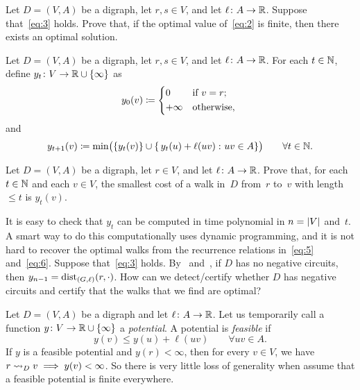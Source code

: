 \documentclass[10pt,reqno]{amsart}
\begin{document}
\begin{exercise}
  \label{ex:4}
  Let \(D = (V,A)\) be a digraph, let \(r,s \in V\), and let
  \(\ell \colon A \to \mathbb{R}\).  Suppose that~\eqref{eq:3} holds.
  Prove that, if the optimal value of~\eqref{eq:2} is finite, then
  there exists an optimal solution.
\end{exercise}

Let \(D = (V,A)\) be a digraph, let \(r,s \in V\), and let
\(\ell \colon A \to \mathbb{R}\).  For each \(t \in \mathbb{N}\), define
\(y_t \colon V \to \mathbb{R} \cup \{\infty\}\) as
\begin{equation}
  \label{eq:5}
  y_0(v)
  \coloneqq
  \begin{cases*}
    0       & if \(v = r\); \\
    +\infty & otherwise,    \\
  \end{cases*}
\end{equation}
and
\begin{equation}
  \label{eq:6}
  y_{t+1}(v)
  \coloneqq
  \min\paren[\big]{
    \set{y_t(v)}
    \cup
    \setst{
      y_t(u) + \ell(uv)
    }{
      uv \in A
    }}
  \qquad
  \forall t \in \Naturals.
\end{equation}

\begin{exercise}
  \label{ex:5}
  Let \(D = (V,A)\) be a digraph, let \(r \in V\), and let
  \(\ell \colon A \to \mathbb{R}\).  Prove that, for each
  \(t \in \mathbb{N}\) and each \(v \in V\), the smallest cost of a
  walk in~\(D\) from~\(r\) to~\(v\) with length \(\leq t\) is
  \(y_t(v)\).
\end{exercise}

It is easy to check that \(y_t\) can be computed in time polynomial in
\(n = \lvert V\rvert\) and~\(t\).  A smart way to do this computationally
uses dynamic programming, and it is not hard to recover the optimal
walks from the recurrence relations in~\eqref{eq:5} and~\eqref{eq:6}.
Suppose that~\eqref{eq:3} holds.  By~
and~, if \(D\) has no negative circuits, then
\(y_{n-1} = \operatorname{dist}_{(G,\ell)}(r,\cdot)\).  How can we detect/certify
whether \(D\) has negative circuits and certify that the walks that we
find are optimal?

Let \(D = (V,A)\) be a digraph and let \(\ell \colon A \to \mathbb{R}\).
Let us temporarily call a function
\(y \colon V \to \mathbb{R} \cup \{\infty\}\) a \emph{potential}.  A
potential is \emph{feasible} if
\begin{equation*}
  y(v) \leq y(u) + \ell(uv)
  \qquad
  \forall uv \in A.
\end{equation*}
If \(y\) is a feasible potential and \(y(r) < \infty\), then for every
\(v \in V\), we have \(r \rightsquigarrow_D v \implies y(v) < \infty\).  So
there is very little loss of generality when assume that a feasible
potential is finite everywhere.
\end{document}
